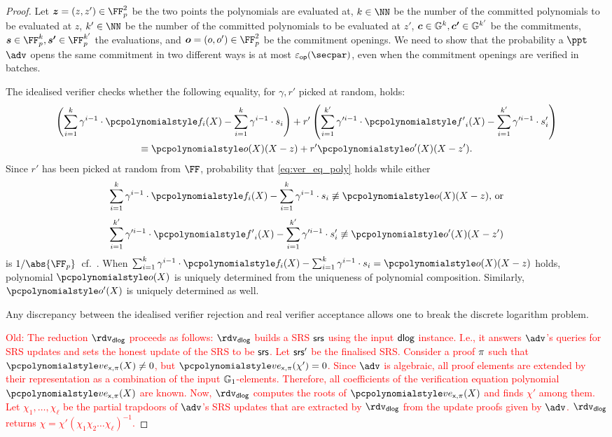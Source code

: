 \begin{proof}
  Let $\vec{z} = (z, z') \in \FF_p^2$ be the two points the polynomials are
  evaluated at, $k \in \NN$ be the number of the committed polynomials to be
  evaluated at $z$, $k' \in \NN$ be the number of the committed polynomials
  to be evaluated at $z'$, $\vec{c} \in \GRP^k, \vec{c'} \in \GRP^{k'}$ be the
  commitments, $\vec{s} \in \FF_p^k, \vec{s'} \in \FF_p^{k'}$ the evaluations,
  and $\vec{o} = (o, o') \in \FF_p^2$ be the commitment openings.  We need to
  show that the probability a $\ppt$ $\adv$ opens the same commitment in two
  different ways is at most $\epsop(\secpar)$, even when the commitment openings
  are verified in batches.

  The idealised verifier checks whether the following equality, for $\gamma, r'$
  picked at random, holds:
  \begin{multline}
    \label{eq:ver_eq_poly}
    \left(\sum_{i = 1}^{k} \gamma^{i - 1} \cdot \p{f}_i(X) - \sum_{i = 1}^{k}
      \gamma^{i - 1} \cdot s_i\right) + r' \left(\sum_{i = 1}^{k'} \gamma'^{i -
        1} \cdot \p{f'}_i(X) -
      \sum_{i = 1}^{k'} \gamma'^{i - 1} \cdot s'_i \right)\\
    \equiv \p{o}(X)(X - z) + r' \p{o}'(X)(X- z').
  \end{multline}
  Since $r'$ has been picked at random from $\FF$, probability that
  \cref{eq:ver_eq_poly} holds while either
  \[
    \sum_{i = 1}^{k} \gamma^{i - 1} \cdot \p{f}_i(X) - \sum_{i = 1}^{k}
    \gamma^{i - 1} \cdot s_i \not\equiv \p{o}(X)(X - z) \text{, or}
  \]
  \[
    \sum_{i = 1}^{k'} \gamma'^{i - 1} \cdot \p{f'}_i(X) - \sum_{i = 1}^{k'}
    \gamma'^{i - 1} \cdot s'_i \not\equiv \p{o'}(X)(X - z')
  \]
  is $\infrac{1}{\abs{\FF_p}}$~cf.~\cite{EPRINT:GabWilCio19}. 
  When \(
    \sum_{i = 1}^{k} \gamma^{i - 1} \cdot \p{f}_i(X) - \sum_{i = 1}^{k}
    \gamma^{i - 1} \cdot s_i = \p{o}(X)(X - z) 
  \)
  holds, polynomial $\p{o}(X)$ is uniquely determined from the uniqueness of
  polynomial composition. Similarly, $\p{o'}(X)$ is uniquely determined as well.

  Any discrepancy
  between the idealised verifier rejection and real verifier acceptance allows
  one to break the discrete logarithm problem.

  \textcolor{red}{Old: The reduction $\rdvdlog$ proceeds as follows: $\rdvdlog$ builds a SRS $\mathsf{srs}$ using the input $\mathsf{dlog}$ instance. I.e., it answers $\adv$'s queries for SRS updates and sets the honest update of the SRS to be $\mathsf{srs}$. Let $\mathsf{srs}'$ be the finalised SRS. 
  Consider a proof $\pi$ such
      that $\vereq_{\inp, \zkproof}(X) \neq 0$, but
      $\vereq_{\inp, \zkproof}(\chi') = 0$. Since $\adv$ is algebraic, all proof
      elements are extended by their representation as a
      combination of the input $\mathbb{G}_1$-elements. Therefore, all coefficients of the
      verification equation polynomial $\vereq_{\inp, \zkproof}(X)$ are known.
   Now, $\rdvdlog$ computes the roots of $\vereq_{\inp, \zkproof}(X)$ and finds $\chi'$ among
      them.
    Let $\chi_1, \ldots, \chi_\ell$ be the partial trapdoors of $\adv$'s SRS updates that are extracted by $\rdvdlog$ from the update proofs given by $\adv$.
  $\rdvdlog$ returns $\chi = \chi' (\chi_1 \chi_2 \ldots \chi_\ell)^{-1}$.}


\end{proof}
